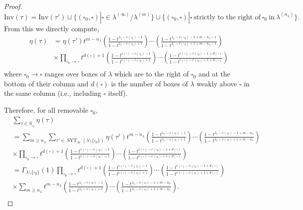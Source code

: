 \documentclass[12pt,reqno]{amsart}
\theoremstyle{definition}
\DeclareMathOperator{\SYT}{\mathrm{SYT}}
\begin{document}
\begin{proof}
    $$\mathrm{Inv}(\tau) = \mathrm{Inv}(\tau') \sqcup \{ (\square_0,\square)| \square \in \lambda^{(\infty)}/\lambda^{(m)}\} \sqcup \{(\square_0,\square)|\square ~ \text{strictly to the right of} ~ \square_0 ~ \text{in} ~ \lambda^{(n_{\lambda})}\}.$$
    From this we directly compute,
    \begin{align*}
        \eta(\tau) &= \eta(\tau') t^{m-n_{\lambda}} \left(\frac{1-t^{\lambda_1-c(\square_0)-1}}{1-t^{\lambda_1-c(\square_0)+1}}\right)\cdots \left(\frac{1-t^{\lambda_1-c(\square_0)-1+m-n_{\lambda}-1}}{1-t^{\lambda_1-c(\square_0)+1+m-n_{\lambda}-1}}\right) \\
        & \times \prod_{\square_0 \rightarrow \square} t^{d(\square)+1}\left(\frac{1-t^{c(\square)-c(\square_0)-1}}{1-t^{c(\square)-c(\square_0)+1}}\right) \cdots \left(\frac{1-t^{c(\square)-c(\square_0)-1+d(\square)}}{1-t^{c(\square)-c(\square_0)+1+d(\square)}}\right)\\
    \end{align*}
    where $\square_0 \rightarrow \square$ ranges over boxes of $\lambda$ which are to the right of $\square_0$ and at the bottom of their column and $d(\square)$ is the number of boxes of $\lambda$ weakly above $\square$ in the same column (i.e., including $\square$ itself).

    Therefore, for all removable $\square_0,$
    \begin{align*}
        &\sum_{\tau\in S_{\square_0}} \eta(\tau) \\
        &=\sum_{m \geq n_{\lambda}} \sum_{\tau' \in \SYT_{\infty}(\lambda\setminus \{\square_0\})}\eta(\tau') t^{m-n_{\lambda}} \left(\frac{1-t^{\lambda_1-c(\square_0)-1}}{1-t^{\lambda_1-c(\square_0)+1}}\right)\cdots \left(\frac{1-t^{\lambda_1-c(\square_0)-1+m-n_{\lambda}}}{1-t^{\lambda_1-c(\square_0)+1+m-n_{\lambda}}}\right) \\
        & \times \prod_{\square_0 \rightarrow \square} t^{d(\square)+1}\left(\frac{1-t^{c(\square)-c(\square_0)-1}}{1-t^{c(\square)-c(\square_0)+1}}\right) \cdots \left(\frac{1-t^{c(\square)-c(\square_0)-1+d(\square)}}{1-t^{c(\square)-c(\square_0)+1+d(\square)}}\right)\\
        &= \Gamma_{\lambda \setminus \{\square_0\}}(1)\prod_{\square_0 \rightarrow \square} t^{d(\square)+1}\left(\frac{1-t^{c(\square)-c(\square_0)-1}}{1-t^{c(\square)-c(\square_0)+1}}\right) \cdots \left(\frac{1-t^{c(\square)-c(\square_0)-1+d(\square)}}{1-t^{c(\square)-c(\square_0)+1+d(\square)}}\right) \\
        & \times \sum_{m \geq n_{\lambda}} t^{m-n_{\lambda}} \left(\frac{1-t^{\lambda_1-c(\square_0)-1}}{1-t^{\lambda_1-c(\square_0)+1}}\right)\cdots \left(\frac{1-t^{\lambda_1-c(\square_0)-1+m-n_{\lambda}}}{1-t^{\lambda_1-c(\square_0)+1+m-n_{\lambda}}}\right).\\
    \end{align*}


\end{proof}
\end{document}
